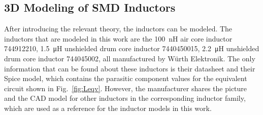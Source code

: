 \subsection{3D Modeling of SMD Inductors}
After introducing the relevant theory, the inductors can be modeled. The inductors that are modeled in this work are the \SI{100}{\nano\henry} air core inductor 744912210, \SI{1.5}{\micro\henry} unshielded drum core inductor 7440450015, \SI{2.2}{\micro\henry} unshielded drum core inductor 744045002, all manufactured by Würth Elektronik. The only information that can be found about these inductors is their datasheet and their Spice model, which contains the parasitic component values for the equivalent circuit shown in Fig.~\ref{fig:Leqv}. However, the manufacturer shares the picture and the CAD model for other inductors in the corresponding inductor family, which are used as a reference for the inductor models in this work.

